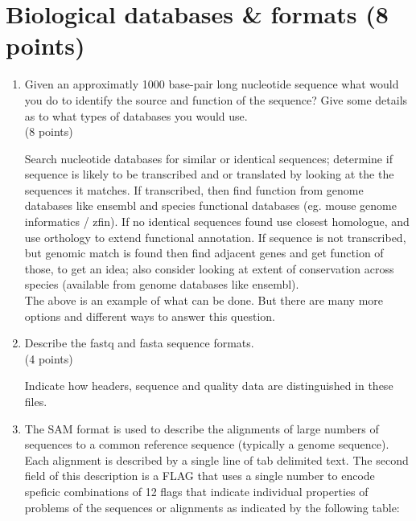\documentclass[11pt]{article}
\begin{document}
\section{ Biological databases \& formats (8 points) }
\begin{enumerate}
\item Given an approximatly 1000 base-pair long nucleotide sequence what would
  you do to identify the source and function of the sequence? Give some
  details as to what types of databases you would use.\\
  (8 points)\\

\begin{Notes}
  Search nucleotide databases for similar or identical sequences; determine if
  sequence is likely to be transcribed and or translated by looking at the the
  sequences it matches. If transcribed, then find function from genome
  databases like ensembl and species functional databases (eg. mouse genome
  informatics / zfin). If no identical sequences found use closest homologue,
  and use orthology to extend functional annotation. If sequence is not
  transcribed, but genomic match is found then find adjacent genes and get
  function of those, to get an idea; also consider looking at extent of
  conservation across species (available from genome databases like
  ensembl).\\
  The above is an example of what can be done. But there are many more
  options and different ways to answer this question.
\end{Notes}

\item Describe the fastq and fasta sequence formats.\\
(4 points)

\begin{Notes}
  Indicate how headers, sequence and quality data are distinguished in these files.
\end{Notes}

\item The SAM format is used to describe the alignments of large numbers of
  sequences to a common reference sequence (typically a genome sequence). Each
  alignment is described by a single line of tab delimited text. The second
  field of this description is a FLAG that uses a single number to encode
  speficic combinations of 12 flags that indicate individual
  properties of problems of the sequences or alignments as indicated by the
  following table:


\end{enumerate}
\end{document}
